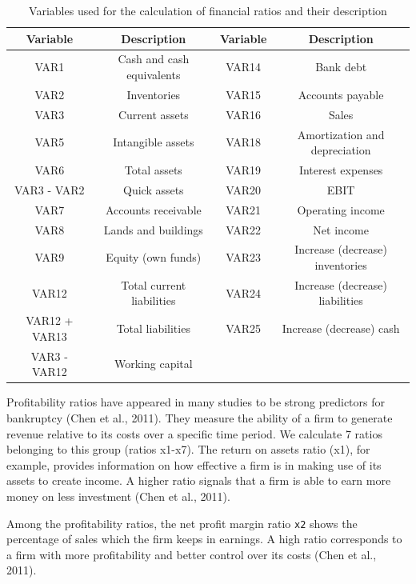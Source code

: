 \documentclass{article}
\begin{document}
\begin{table}
\begin{center}
\caption{Variables used for the calculation of financial ratios and their description}
\footnotesize
\begin{tabular}{cccc} 
\hline\hline
Variable  & Description & Variable & Description\\ 
\hline
VAR1 & Cash and cash equivalents & VAR14 & Bank debt\\
VAR2 & Inventories & VAR15 & Accounts payable\\
VAR3 & Current assets & VAR16 & Sales\\ 
VAR5 & Intangible assets & VAR18 & Amortization and depreciation\\
VAR6 & Total assets & VAR19 & Interest expenses\\
VAR3 - VAR2 & Quick assets & VAR20 & EBIT\\
VAR7 & Accounts receivable & VAR21 & Operating income\\
VAR8 & Lands and buildings & VAR22 & Net income\\
VAR9 & Equity (own funds) & VAR23 & Increase (decrease) inventories\\
VAR12 & Total current liabilities & VAR24 & Increase (decrease) liabilities\\
VAR12 + VAR13 & Total liabilities & VAR25 & Increase (decrease) cash\\
VAR3 - VAR12 & Working capital & &\\ 
\hline\hline
\end{tabular}
\end{center}
\end{table}

Profitability ratios have appeared in many studies to be strong predictors for bankruptcy (Chen et al., 2011). They measure the ability of a firm to generate revenue relative to its costs over a specific time period. We calculate 7 ratios belonging to this group (ratios x1-x7). The return on assets ratio (x1), for example, provides information on how effective a firm is in making use of its assets to create income. A higher ratio signals that a firm is able to earn more money on less investment (Chen et al., 2011). 

Among the profitability ratios, the net profit margin ratio \texttt{x2} shows the percentage of sales which the firm keeps in earnings. A high ratio corresponds to a firm with more profitability and better control over its costs (Chen et al., 2011).  
\end{document}
